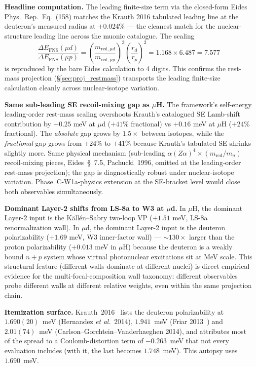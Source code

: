\documentclass[11pt]{article}
\begin{document}
\textbf{Headline computation.}  The leading finite-size
term via the closed-form Eides Phys.\ Rep.\ Eq.~(158) matches the Krauth 2016
tabulated leading line at the deuteron's measured radius at
$+0.024\%$ --- the cleanest match for the
nuclear-structure leading line across the muonic catalogue.
The scaling
\begin{equation}
\frac{\Delta E_\text{FNS}(\mu d)}{\Delta E_\text{FNS}(\mu p)}
= \left(\frac{m_{\text{red},\mu d}}{m_{\text{red},\mu p}}\right)^3
  \left(\frac{r_d}{r_p}\right)^2
= 1.168 \times 6.487 = 7.577
\end{equation}
is reproduced by the bare Eides calculation to 4 digits.
This confirms the rest-mass projection (\S\ref{sec:proj_restmass})
transports the leading finite-size calculation cleanly
across nuclear-isotope variation.

\textbf{Same sub-leading SE recoil-mixing gap as $\mu$H.}  The
framework's self-energy leading-order rest-mass scaling overshoots
Krauth's catalogued SE Lamb-shift contribution by $+0.25$ meV at
$\mu$d ($+41\%$ fractional) vs $+0.16$ meV at $\mu$H ($+24\%$
fractional).  The \emph{absolute} gap grows by $1.5\times$ between
isotopes, while the \emph{fractional} gap grows from $+24\%$ to
$+41\%$ because Krauth's tabulated SE shrinks slightly more.  Same
physical mechanism (sub-leading $\alpha(Z\alpha)^4 \times
(m_\text{red}/m_n)$ recoil-mixing pieces, Eides~\S~7.5, Pachucki~1996,
omitted at the leading-order rest-mass projection); the gap is
diagnostically robust under nuclear-isotope variation.
Phase~C-W1a-physics extension at the SE-bracket level would close
both observables simultaneously.

\textbf{Dominant Layer-2 shifts from LS-8a to W3 at $\mu$d.}  In
$\mu$H, the dominant Layer-2 input is the K\"all\'en--Sabry two-loop
VP ($+1.51$ meV, LS-8a renormalization wall).  In $\mu$d, the
dominant Layer-2 input is the deuteron polarizability ($+1.69$ meV,
W3 inner-factor wall) --- $\sim 130\times$ larger than the proton
polarizability ($+0.013$ meV in $\mu$H) because the deuteron is a
weakly bound $n+p$ system whose virtual photonuclear excitations sit
at MeV scale.  This structural feature (different walls dominate at
different nuclei) is direct empirical evidence for the
multi-focal-composition wall taxonomy: different observables probe
different walls at different relative weights, even within the same
projection chain.

\textbf{Itemization surface.}  Krauth~2016~\cite{krauth2016} lists
the deuteron polarizability at $1.690(20)$~meV (Hernandez \emph{et
al.}\ 2014), $1.941$~meV (Friar 2013~\cite{friar2013}) and $2.01(74)$~meV
(Carlson--Gorchtein--Vanderhaeghen 2014), and attributes most of the
spread to a Coulomb-distortion term of $-0.263$~meV that not every
evaluation includes (with it, the last becomes $1.748$~meV).  This
autopsy uses $1.690$~meV.
\end{document}
